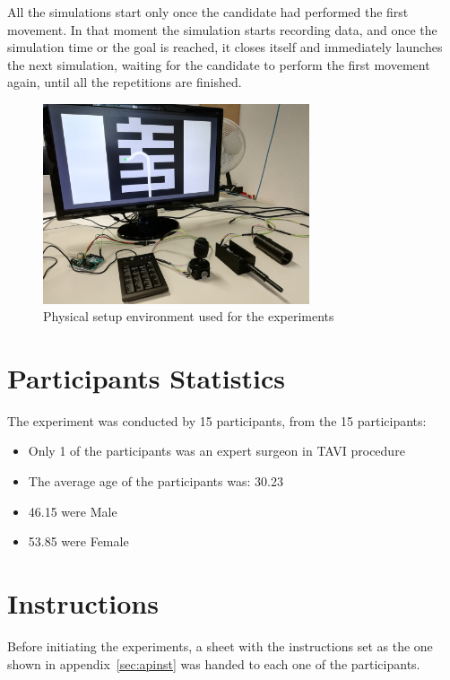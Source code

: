 All the simulations start only once the candidate had performed the first movement. In that moment the simulation starts recording data, and once the simulation time or the goal is reached, it closes itself and immediately launches the next simulation, waiting for the candidate to perform the first movement again, until all the repetitions are finished.\\

\begin{figure}[ht]
   \centering
   \includegraphics[width=0.7\textwidth]{img/setup.jpg}
   \caption{Physical setup environment used for the experiments}
   \label{img:setupphy}
\end{figure}

\section{Participants Statistics}\label{sec:partstats}
The experiment was conducted by 15 participants, from the 15 participants:
\begin{itemize}
\item  Only 1 of the participants was an expert surgeon in TAVI procedure
 \item The average age of the participants was: 30.23
 \item 46.15 were Male
 \item 	53.85 were Female
\end{itemize}


\section{Instructions}\label{sec:instructions}
Before initiating the experiments, a sheet with the instructions set as the one shown in appendix~\ref{sec:apinst} was handed to each one of the participants.\\


